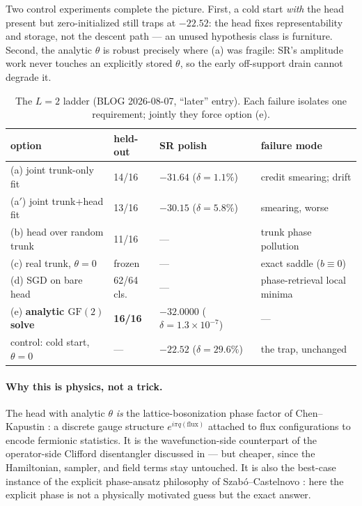 \documentclass[11pt]{article}
\newcommand{\GF}{\mathrm{GF}(2)}
\begin{document}
Two control experiments complete the picture. First, a cold start \emph{with}
the head present but zero-initialized still traps at $-22.52$: the head fixes
representability and storage, not the descent path --- an unused hypothesis
class is furniture. Second, the analytic $\theta$ is robust precisely where
(a) was fragile: SR's amplitude work never touches an explicitly stored
$\theta$, so the early off-support drain cannot degrade it.

\begin{table}[h]
\centering\small
\setlength{\tabcolsep}{4.5pt}
\begin{tabular}{@{}llll@{}}
\toprule
option & held-out & SR polish & failure mode \\
\midrule
(a) joint trunk-only fit & 14/16 & $-31.64$ ($\delta=1.1\%$) & credit smearing; drift \\
(a$'$) joint trunk+head fit & 13/16 & $-30.15$ ($\delta=5.8\%$) & smearing, worse \\
(b) head over random trunk & 11/16 & --- & trunk phase pollution \\
(c) real trunk, $\theta=0$ & frozen & --- & exact saddle ($b\equiv0$) \\
(d) SGD on bare head & 62/64 cls. & --- & phase-retrieval local minima \\
(e) \textbf{analytic $\GF$ solve} & \textbf{16/16} & $\mathbf{-32.0000}$
($\delta=1.3\times10^{-7}$) & --- \\
\midrule
control: cold start, $\theta=0$ & --- & $-22.52$ ($\delta=29.6\%$) &
the trap, unchanged \\
\bottomrule
\end{tabular}
\caption{The $L=2$ ladder (BLOG 2026-08-07, ``later'' entry). Each failure
isolates one requirement; jointly they force option (e).}
\label{tab:ladder}
\end{table}

\paragraph{Why this is physics, not a trick.}
The head with analytic $\theta$ \emph{is} the lattice-bosonization phase
factor of Chen--Kapustin \cite{ChenKapustinRadicevic2018,ChenKapustin2019}: a
discrete gauge structure $e^{i\pi q(\mathrm{flux})}$ attached to flux
configurations to encode fermionic statistics. It is the wavefunction-side
counterpart of the operator-side Clifford disentangler discussed in
\cite{SignNote} --- but cheaper, since the Hamiltonian, sampler, and field
terms stay untouched. It is also the best-case instance of the explicit
phase-ansatz philosophy of Szab\'o--Castelnovo \cite{SzaboCastelnovo2020}:
here the explicit phase is not a physically motivated guess but the exact
answer.
\end{document}
